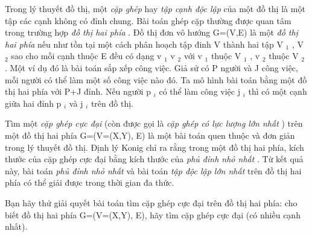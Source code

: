Trong lý thuyết đồ thị, một   \textit{    cặp ghép   }   hay   \textit{    tập cạnh độc lập   }   của một đồ thị là một tập các cạnh không có đỉnh chung. Bài toán ghép   cặp thường được quan tâm trong trường hợp   \textit{    đồ thị hai phía   }   . Đồ thị đơn vô hướng G=(V,E) là một   \textit{    đồ thị hai phía   }   nếu như tồn tại một   cách phân hoạch tập đinh V thành hai tập V   $_    1   $   , V   $_    2   $   sao cho mỗi cạnh thuộc E đều có dạng v   $_    1   $   v   $_    2   $   với v   $_    1   $   thuộc V   $_    1   $   , v   $_    2   $   thuộc V   $_    2   $   . Một ví dụ đó là bài toán sắp xếp công việc. Giả sử có P người và   J công việc, mỗi người có thể làm một số công việc nào đó. Ta mô hình bài toán bằng một đồ thị hai phía với P+J đỉnh. Nếu người p   $_    i   $   có   thể làm công việc j   $_    i   $   thì có một cạnh giữa hai đỉnh p   $_    i   $   và j   $_    i   $   trên đồ thị.  

   Tìm một   \textit{    cặp ghép cực đại   }   (còn được gọi là   \textit{    cặp ghép có lực lượng lớn nhất   }   ) trên một đồ thị hai phía G=(V=(X,Y), E) là một bài   toán quen thuộc và đơn giản trong lý thuyết đồ thị. Định lý Konig chỉ ra rằng trong một đồ thị hai phía, kích thước của cặp ghép cực đại bằng kích thước   của   \textit{    phủ đỉnh nhỏ nhất   }   . Từ kết quả này, bài toán   \textit{    phủ đỉnh nhỏ nhất   }   và bài toán   \textit{    tập độc lập lớn nhất   }   trên đồ thị hai phía có thể giải   được trong thời gian đa thức.  

   Bạn hãy thử giải quyết bài toán tìm cặp ghép cực đại trên đồ thị hai phía: cho biết đồ thị hai phía G=(V=(X,Y), E), hãy tìm cặp ghép cực đại (có   nhiều cạnh nhất).